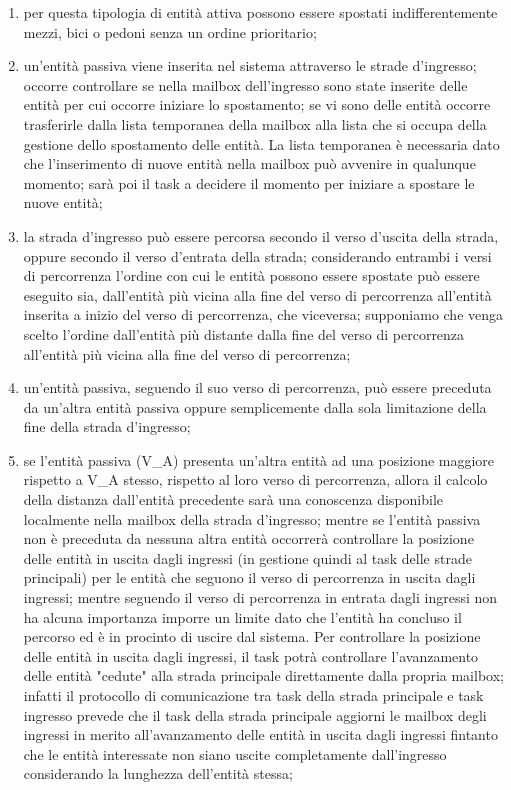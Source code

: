 \begin{enumerate}
\item per questa tipologia di entità attiva possono essere spostati
indifferentemente mezzi, bici o pedoni senza un ordine prioritario;
\item un'entità passiva viene inserita nel sistema attraverso le strade d'ingresso; occorre controllare se nella mailbox dell'ingresso sono state inserite delle entità per cui occorre iniziare lo spostamento; se vi sono delle entità occorre trasferirle dalla lista temporanea della mailbox alla lista che si occupa della gestione dello spostamento delle entità. La lista temporanea è necessaria dato che l'inserimento di nuove entità nella mailbox può avvenire in qualunque momento; sarà poi il task a decidere il momento per iniziare a spostare le nuove entità;
\item la strada d'ingresso può essere percorsa secondo il verso d'uscita della strada, oppure secondo il verso d'entrata della strada; considerando entrambi i versi di percorrenza l'ordine con cui le entità possono essere spostate può essere eseguito sia, dall'entità più vicina alla fine del verso di percorrenza all'entità inserita a inizio del verso di percorrenza, che viceversa; supponiamo che venga scelto l'ordine dall'entità più distante dalla fine del verso di percorrenza all'entità più vicina alla fine del verso di percorrenza;
\item un'entità passiva, seguendo il suo verso di percorrenza, può essere preceduta da un'altra entità passiva oppure semplicemente dalla sola limitazione della fine della strada d'ingresso;
\item se l'entità passiva (V\_A) presenta un'altra entità ad una posizione maggiore rispetto a V\_A stesso, rispetto al loro verso di percorrenza, allora il calcolo della distanza dall'entità precedente sarà una conoscenza disponibile localmente nella mailbox della strada d'ingresso; mentre se l'entità passiva non è preceduta da nessuna altra entità occorrerà controllare la posizione delle entità in uscita dagli ingressi (in gestione quindi al task delle strade principali) per le entità che seguono il verso di percorrenza in uscita dagli ingressi; mentre seguendo il verso di percorrenza in entrata dagli ingressi non ha alcuna importanza imporre un limite dato che l'entità ha concluso il percorso ed è in procinto di uscire dal sistema.
Per controllare la posizione delle entità in uscita dagli ingressi, il task potrà controllare l'avanzamento delle entità "cedute" alla strada principale direttamente dalla propria mailbox; infatti il protocollo di comunicazione tra task della strada principale e task ingresso prevede che il task della strada principale aggiorni le mailbox degli ingressi in merito all'avanzamento delle entità in uscita dagli ingressi fintanto che le entità interessate non siano uscite completamente dall'ingresso considerando la lunghezza dell'entità stessa;

\end{enumerate}

